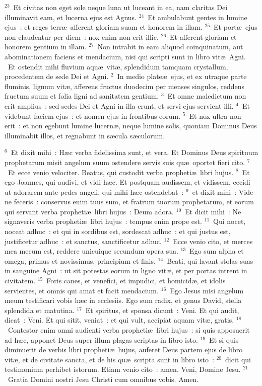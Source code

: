 ${}^{23}$~Et civitas non eget sole neque luna ut luceant in ea, nam claritas Dei illuminavit eam, et lucerna ejus est Agnus.
${}^{24}$~Et ambulabunt gentes in lumine ejus~: et reges terr\ae\ afferent gloriam suam et honorem in illam.
${}^{25}$~Et port\ae\ ejus non claudentur per diem~: nox enim non erit illic.
${}^{26}$~Et afferent gloriam et honorem gentium in illam.
${}^{27}$~Non intrabit in eam aliquod coinquinatum, aut abominationem faciens et mendacium, nisi qui scripti sunt in libro vit\ae\ Agni.
~\lettrine[lines=10,image=true,loversize=0.05,lraise=-0.03]{E}{}t ostendit mihi fluvium aqu\ae\ vit\ae , splendidum tamquam crystallum, procedentem de sede Dei et Agni.
${}^{2}$~In medio plate\ae\ ejus, et ex utraque parte fluminis, lignum vit\ae , afferens fructus duodecim per menses singulos, reddens fructum suum et folia ligni ad sanitatem gentium.
${}^{3}$~Et omne maledictum non erit amplius~: sed sedes Dei et Agni in illa erunt, et servi ejus servient illi.
${}^{4}$~Et videbunt faciem ejus~: et nomen ejus in frontibus eorum.
${}^{5}$~Et nox ultra non erit~: et non egebunt lumine lucern\ae , neque lumine solis, quoniam Dominus Deus illuminabit illos, et regnabunt in s\ae cula s\ae culorum.


${}^{6}$~Et dixit mihi~: H\ae c verba fidelissima sunt, et vera. Et Dominus Deus spirituum prophetarum misit angelum suum ostendere servis suis qu\ae\ oportet fieri cito.
${}^{7}$~Et ecce venio velociter. Beatus, qui custodit verba propheti\ae\ libri hujus.
${}^{8}$~Et ego Joannes, qui audivi, et vidi h\ae c. Et postquam audissem, et vidissem, cecidi ut adorarem ante pedes angeli, qui mihi h\ae c ostendebat~:
${}^{9}$~et dixit mihi~: Vide ne feceris~: conservus enim tuus sum, et fratrum tuorum prophetarum, et eorum qui servant verba propheti\ae\ libri hujus~: Deum adora.
${}^{10}$~Et dicit mihi~: Ne signaveris verba propheti\ae\ libri hujus~: tempus enim prope est.
${}^{11}$~Qui nocet, noceat adhuc~: et qui in sordibus est, sordescat adhuc~: et qui justus est, justificetur adhuc~: et sanctus, sanctificetur adhuc.
${}^{12}$~Ecce venio cito, et merces mea mecum est, reddere unicuique secundum opera sua.
${}^{13}$~Ego sum alpha et omega, primus et novissimus, principium et finis.
${}^{14}$~Beati, qui lavant stolas suas in sanguine Agni~: ut sit potestas eorum in ligno vit\ae , et per portas intrent in civitatem.
${}^{15}$~Foris canes, et venefici, et impudici, et homicid\ae , et idolis servientes, et omnis qui amat et facit mendacium.
${}^{16}$~Ego Jesus misi angelum meum testificari vobis h\ae c in ecclesiis. Ego sum radix, et genus David, stella splendida et matutina.
${}^{17}$~Et spiritus, et sponsa dicunt~: Veni. Et qui audit, dicat~: Veni. Et qui sitit, veniat~: et qui vult, accipiat aquam vit\ae , gratis.
${}^{18}$~Contestor enim omni audienti verba propheti\ae\ libri hujus~: si quis apposuerit ad h\ae c, apponet Deus super illum plagas scriptas in libro isto.
${}^{19}$~Et si quis diminuerit de verbis libri propheti\ae\ hujus, auferet Deus partem ejus de libro vit\ae , et de civitate sancta, et de his qu\ae\ scripta sunt in libro isto~:
${}^{20}$~dicit qui testimonium perhibet istorum. Etiam venio cito~: amen. Veni, Domine Jesu.
${}^{21}$~Gratia Domini nostri Jesu Christi cum omnibus vobis. Amen.
